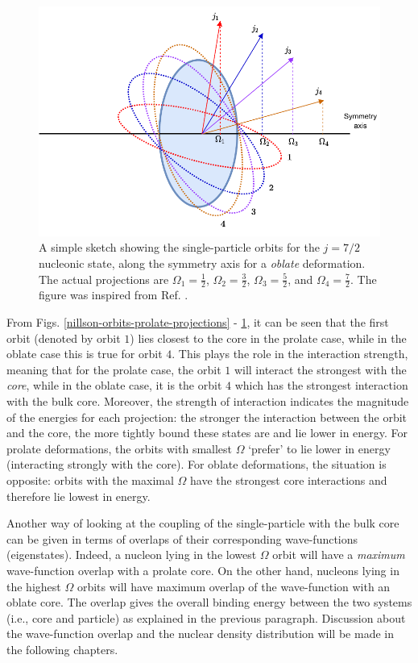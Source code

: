 \begin{figure}
    \centering
    \includegraphics[scale=1]{Chapters/Figures/nillson_SP_orbits_2.pdf}
    \caption{A simple sketch showing the single-particle orbits for the $j=7/2$ nucleonic state, along the symmetry axis for a \emph{oblate} deformation. The actual projections are $\Omega_1=\frac{1}{2}$, $\Omega_2=\frac{3}{2}$, $\Omega_3=\frac{5}{2}$, and $\Omega_4=\frac{7}{2}$. The figure was inspired from Ref. \cite{krane1991introductory}.}
    \label{nillson-orbits-oblate-projections}
\end{figure}

From Figs. \ref{nillson-orbits-prolate-projections} - \ref{nillson-orbits-oblate-projections}, it can be seen that the first orbit (denoted by orbit $1$) lies closest to the core in the prolate case, while in the oblate case this is true for orbit $4$. This plays the role in the interaction strength, meaning that for the prolate case, the orbit $1$ will interact the strongest with the \emph{core}, while in the oblate case, it is the orbit $4$ which has the strongest interaction with the bulk core. Moreover, the strength of interaction indicates the magnitude of the energies for each projection: the stronger the interaction between the orbit and the core, the more tightly bound these states are and lie lower in energy. For prolate deformations, the orbits with smallest $\Omega$ `prefer' to lie lower in energy (interacting strongly with the core). For oblate deformations, the situation is opposite: orbits with the maximal $\Omega$ have the strongest core interactions and therefore lie lowest in energy.

Another way of looking at the coupling of the single-particle with the bulk core can be given in terms of overlaps of their corresponding wave-functions (eigenstates). Indeed, a nucleon lying in the lowest $\Omega$ orbit will have a \emph{maximum} wave-function overlap with a prolate core. On the other hand, nucleons lying in the highest $\Omega$ orbits will have maximum overlap of the wave-function with an oblate core. The overlap gives the overall binding energy between the two systems (i.e., core and particle) as explained in the previous paragraph. Discussion about the wave-function overlap and the nuclear density distribution \cite{frauendorf2014transverse, das2018nuclear} will be made in the following chapters.

